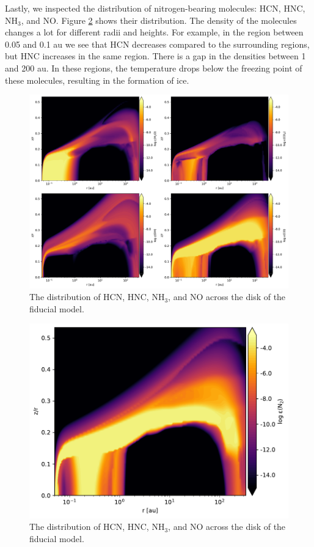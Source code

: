 \documentclass[oneside, single, authoryear, semicolon]{lion-msc}
\newcommand{\4}{$_4$}
\newcommand{\3}{$_3$}
\newcommand{\2}{$_2$}
\begin{document}
Lastly, we inspected the distribution of nitrogen-bearing molecules: HCN, HNC, NH\3, and NO. Figure \ref{fig: nitrogen distribution} shows their distribution. The density of the molecules changes a lot for different radii and heights. For example, in the region between 0.05 and 0.1 au we see that HCN decreases compared to the surrounding regions, but HNC increases in the same region. There is a gap in the densities between 1 and 200 au. In these regions, the temperature drops below the freezing point of these molecules, resulting in the formation of ice. 


\begin{figure}[!ht]
    \centering
    \includegraphics[width=\linewidth]{Figures/Abundance1.pdf}
    \caption{The distribution of HCN, HNC, NH\3, and NO across the disk of the fiducial model.}
    \label{fig: nitrogen distribution}
\end{figure}

\begin{figure}[!ht]
    \centering
    \includegraphics[width=\linewidth]{Figures/AbundanceN2.pdf}
    \caption{The distribution of HCN, HNC, NH\3, and NO across the disk of the fiducial model.}
    \label{fig: nitrogen distribution}
\end{figure}
\end{document}
